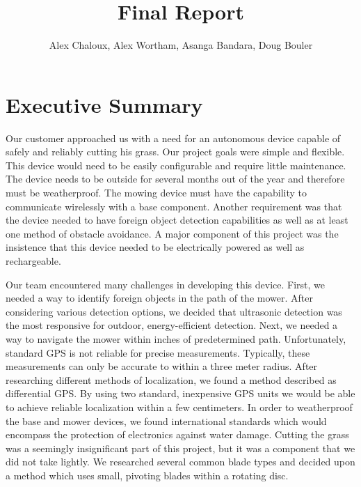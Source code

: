 \documentclass[12pt,letterpaper]{article}
\title{Final Report}
\author{Alex Chaloux, Alex Wortham, Asanga Bandara, Doug Bouler}
\begin{document}
\reqstitlepage

\tableofcontents
\clearpage
{}

\section{Executive Summary}


Our customer approached us with a need for an autonomous device capable of
safely and reliably cutting his grass. Our project goals were simple and
flexible. This device would need to be easily configurable and require little
maintenance. The device needs to be outside for several months out of the year
and therefore must be weatherproof. The mowing device must have the capability
to communicate wirelessly with a base component.  Another requirement was that
the device needed to have foreign object detection capabilities as well as at
least one method of obstacle avoidance. A major component of this project was
the insistence that this device needed to be electrically powered as well as
rechargeable.

Our team encountered many challenges in developing this device. First, we needed
a way to identify foreign objects in the path of the mower. After considering
various detection options, we decided that ultrasonic detection was the most
responsive for outdoor, energy-efficient detection. Next, we needed a way to
navigate the mower within inches of predetermined path. Unfortunately, standard
GPS is not reliable for precise measurements. Typically, these measurements can
only be accurate to within a three meter radius. After researching different
methods of localization, we found a method described as differential GPS. By
using two standard, inexpensive GPS units we would be able to achieve reliable
localization within a few centimeters. In order to weatherproof the base and
mower devices, we found international standards which would encompass the
protection of electronics against water damage. Cutting the grass was a
seemingly insignificant part of this project, but it was a component that we did
not take lightly. We researched several common blade types and decided upon a
method which uses small, pivoting blades within a rotating disc.
\end{document}
